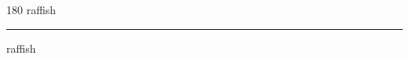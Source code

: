 
\begin{frame}
\begin{center}
\begin{turn}{180}
{\fontsize{2.5cm}{1em}\selectfont raffish}
\end{turn}
\vspace{1em}\par  
\hrule
\vspace{1em}\par  
{\fontsize{2.5cm}{1em}\selectfont raffish}
\end{center}
\end{frame}
